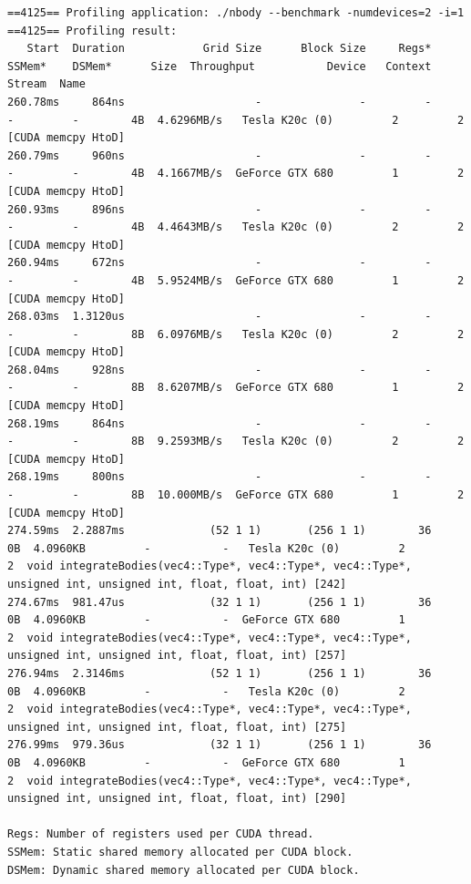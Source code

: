 \begin{verbatim}
==4125== Profiling application: ./nbody --benchmark -numdevices=2 -i=1
==4125== Profiling result:
   Start  Duration            Grid Size      Block Size     Regs*    SSMem*    DSMem*      Size  Throughput           Device   Context    Stream  Name
260.78ms     864ns                    -               -         -         -         -        4B  4.6296MB/s   Tesla K20c (0)         2         2  [CUDA memcpy HtoD]
260.79ms     960ns                    -               -         -         -         -        4B  4.1667MB/s  GeForce GTX 680         1         2  [CUDA memcpy HtoD]
260.93ms     896ns                    -               -         -         -         -        4B  4.4643MB/s   Tesla K20c (0)         2         2  [CUDA memcpy HtoD]
260.94ms     672ns                    -               -         -         -         -        4B  5.9524MB/s  GeForce GTX 680         1         2  [CUDA memcpy HtoD]
268.03ms  1.3120us                    -               -         -         -         -        8B  6.0976MB/s   Tesla K20c (0)         2         2  [CUDA memcpy HtoD]
268.04ms     928ns                    -               -         -         -         -        8B  8.6207MB/s  GeForce GTX 680         1         2  [CUDA memcpy HtoD]
268.19ms     864ns                    -               -         -         -         -        8B  9.2593MB/s   Tesla K20c (0)         2         2  [CUDA memcpy HtoD]
268.19ms     800ns                    -               -         -         -         -        8B  10.000MB/s  GeForce GTX 680         1         2  [CUDA memcpy HtoD]
274.59ms  2.2887ms             (52 1 1)       (256 1 1)        36        0B  4.0960KB         -           -   Tesla K20c (0)         2         2  void integrateBodies(vec4::Type*, vec4::Type*, vec4::Type*, unsigned int, unsigned int, float, float, int) [242]
274.67ms  981.47us             (32 1 1)       (256 1 1)        36        0B  4.0960KB         -           -  GeForce GTX 680         1         2  void integrateBodies(vec4::Type*, vec4::Type*, vec4::Type*, unsigned int, unsigned int, float, float, int) [257]
276.94ms  2.3146ms             (52 1 1)       (256 1 1)        36        0B  4.0960KB         -           -   Tesla K20c (0)         2         2  void integrateBodies(vec4::Type*, vec4::Type*, vec4::Type*, unsigned int, unsigned int, float, float, int) [275]
276.99ms  979.36us             (32 1 1)       (256 1 1)        36        0B  4.0960KB         -           -  GeForce GTX 680         1         2  void integrateBodies(vec4::Type*, vec4::Type*, vec4::Type*, unsigned int, unsigned int, float, float, int) [290]

Regs: Number of registers used per CUDA thread.
SSMem: Static shared memory allocated per CUDA block.
DSMem: Dynamic shared memory allocated per CUDA block.
\end{verbatim}


